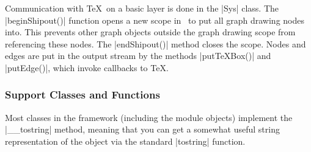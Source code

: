 %

Communication with \TeX\ on a basic layer is done in the |Sys|
class. The |beginShipout()| function opens a new scope in \pgfname\
to put all graph drawing nodes into. This prevents other graph objects
outside the graph drawing scope from referencing these nodes. The
|endShipout()| method closes the scope. Nodes and edges are put in the
output stream by the methods |putTeXBox()| and |putEdge()|, which
invoke callbacks to \TeX. 


\subsubsection{Support Classes and Functions}

Most classes in the framework (including the module objects) implement
the |__tostring| method, meaning that you can get a somewhat useful
string representation of the object via the standard |tostring|
function.

%
%
%


